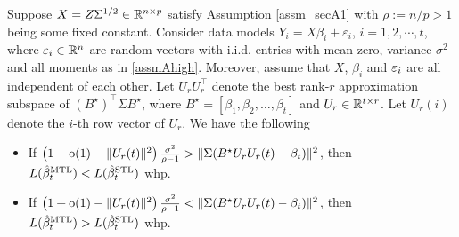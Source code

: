 \begin{theorem}\label{thm_many_tasks}
Suppose $X=Z\Sigma^{1/2}\in \mathbb{R}^{n\times p}$ satisfy Assumption \ref{assm_secA1} with $\rho:=n/p>1$ being some fixed constant. Consider data models  $Y_i = X\beta_i + \varepsilon_i$, $i=1,2,\cdots, t$, where ${\varepsilon}_i\in \mathbb{R}^{n}$ are random vectors with i.i.d. entries with mean zero, variance $\sigma^2$ and all moments as in \eqref{assmAhigh}. Moreover, assume that $X$, $\beta_i$ and ${\varepsilon}_i$ are all independent of each other.  
	Let $U_r U_r^{\top}$ denote the best rank-$r$ approximation subspace of $(B^{\star})^\top\Sigma B^{\star}$, where $B^\star = [{\beta}_1,{\beta}_2,\dots,{\beta}_{t}]$ and $U_r\in\mathbb{R}^{t\times r}$.
	Let $U_r(i)$ denote the $i$-th row vector of $U_r$.
	We have the following 
	\begin{itemize}
		\item If $\left(1 -\operatorname{o}(1)- \|U_r(t)\|^2 \right)\frac{\sigma^2}{\rho - 1} > \|\Sigma (B^{\star} U_r U_r(t) - \beta_t)\|^2 $, then $L(\hat{\beta}_t^{\text{MTL}}) < L(\hat{\beta}_t^{\text{STL}})$ whp.
		\item If $\left(1 +\operatorname{o}(1)- \|U_r(t)\|^2\right)\frac{\sigma^2}{\rho - 1} < \|\Sigma(B^{\star} U_r U_r(t) - \beta_t)\|^2$, then $L(\hat{\beta}_t^{\text{MTL}}) > L(\hat{\beta}_t^{\text{STL}})$ whp.
	\end{itemize}
\end{theorem}




